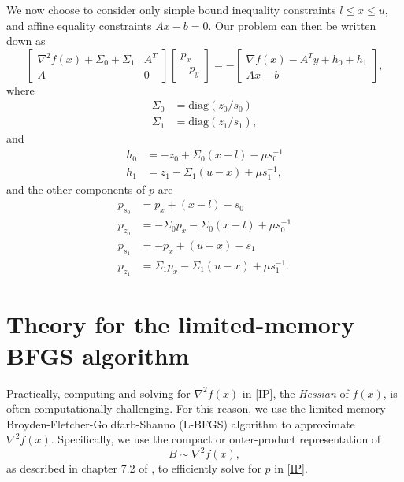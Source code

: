 \documentclass{article}
\begin{document}
We now choose to consider only  
    simple bound inequality constraints $l \le x \le u$, and
    affine equality constraints $A x - b = 0$.
Our problem can then be written down as
\begin{equation}
\begin{bmatrix}
    \nabla^2 f(x) + \Sigma_0 + \Sigma_1 & A^T \\
    A & 0 
\end{bmatrix}
\begin{bmatrix} p_x \\ -p_y \end{bmatrix}
    = -
\begin{bmatrix}
    \nabla f(x) - A^T y + h_0 + h_1 \\ A x - b
\end{bmatrix},
\label{IP}
\end{equation}
    where
    \begin{subequations}\begin{align}
    \Sigma_0 &= \text{diag}(z_0 / s_0) \\
    \Sigma_1 &= \text{diag}(z_1 / s_1),
    \end{align}\end{subequations}
    and
    \begin{subequations}\begin{align}
    h_0 &= -z_0 + \Sigma_0 (x - l) - \mu s_0^{-1} \\
    h_1 &= z_1 - \Sigma_1 (u - x) + \mu s_1^{-1}, 
    \end{align}\end{subequations}
    and the other components of $p$ are
\begin{subequations}\begin{align}
    p_{s_0} &= p_x + (x - l) - s_0 \\
    p_{z_0} &= -\Sigma_0 p_x - \Sigma_0 (x - l) + \mu s_0^{-1} \\
    p_{s_1} &= -p_x + (u - x) - s_1 \\
    p_{z_1} &= \Sigma_1 p_x - \Sigma_1 (u - x) + \mu s_1^{-1}.
\end{align}\label{p_other}\end{subequations}

\section{Theory for the limited-memory BFGS algorithm}
Practically, computing and solving for $\nabla^2 f(x)$ in \eqref{IP}, 
    the \emph{Hessian} of $f(x)$, is often computationally challenging.
For this reason, we use the 
    limited-memory Broyden-Fletcher-Goldfarb-Shanno (L-BFGS) algorithm
    to approximate $\nabla^2 f(x)$.
Specifically, we use the compact or outer-product representation of 
    \begin{equation} B \sim \nabla^2 f(x), \end{equation}
    as described in chapter 7.2 of \cite{NW04},
    to efficiently solve for $p$ in \eqref{IP}.
\end{document}
